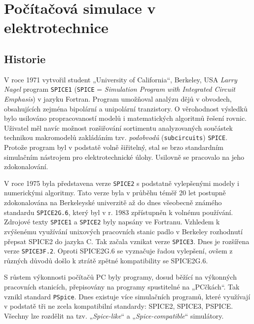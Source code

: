 {
\chapter{Počítačová simulace v elektrotechnice}
\minitoc

  \section{Historie}
    V roce 1971 vytvořil student „University of California“, Berkeley, USA \emph{Larry Nagel} 
    program \texttt{SPICE1} (\texttt{SPICE} = \emph{Simulation Program with Integrated Circuit 
    Emphasis}) v jazyku Fortran. Program umožňoval analýzu dějů v obvodech, obsahujících zejména 
    bipolární a
    unipolární tranzistory. O věrohodnost výsledků bylo usilováno propracovaností modelů i 
    matematických algoritmů řešení rovnic. Uživatel měl navíc  možnost roz\-ši\-řo\-vá\-ní 
    sortimentu analyzovaných součástek technikou makromodelů zakládáním tzv. \emph{pod\-ob\-vo\-dů}
    (\texttt{subcircuits}) \texttt{SPICE}. Protože program byl v podstatě volně šiřitelný, stal se 
    brzo standardním simulačním nástrojem pro elektrotechnické úlohy. Usilovně se pracovalo na jeho 
    zdokonalování.

    V roce 1975 byla představena verze \texttt{SPICE2} s podstatně vylepšenými modely i numerickými 
    algoritmy. Tato verze byla v průběhu téměř 20 let postupně zdokonalována na Berkeleyské 
    univerzitě až do dnes všeobecně známého standardu \texttt{SPICE2G.6}, který byl v r. 1983 
    zpřístupněn k volnému používání. Zdrojové texty \texttt{SPICE1} a \texttt{SPICE2} byly napsány 
    ve Fortranu. Vzhledem k zvýšenému využívání unixových pracovních stanic padlo v Berkeley 
    rozhodnutí přepsat SPICE2 do jazyka C. Tak začala vznikat verze \texttt{SPICE3}. Dnes je 
    rozšířena verze \texttt{SPICE3F.2}. Oproti SPICE2G.6 se vyznačuje řadou vylepšení, ovšem z 
    různých důvodů došlo k ztrátě zpětné kompatibility se SPICE2G.6.

    S růstem výkonnosti počítačů PC byly programy, dosud běžící na výkonných pracovních stanicích, 
    přepisovány na programy spustitelné na „PCčkách“. Tak vznikl standard \texttt{PSpice}. Dnes 
    existuje více simulačních programů, které využívají v podstatě tři ne zcela kompatibilní 
    standardy: SPICE2, SPICE3, PSPICE. Všechny lze rozdělit na tzv. „\emph{Spice-like}“ a 
    „\emph{Spice-compatible}“ simulátory.

}
